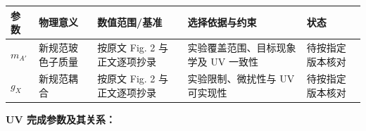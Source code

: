 \documentclass[
  chinese,
  UTF8]{ctexart}
\newcounter{none} %
\begin{document}
{\def\LTcaptype{none} %
\begin{longtable}[]{@{}
  >{\raggedright\arraybackslash}p{}
  >{\raggedright\arraybackslash}p{}
  >{\raggedright\arraybackslash}p{}
  >{\raggedright\arraybackslash}p{}
  >{\raggedright\arraybackslash}p{}@{}}
\toprule\noalign{}
\begin{minipage}[b]{\linewidth}\raggedright
参数
\end{minipage} & \begin{minipage}[b]{\linewidth}\raggedright
物理意义
\end{minipage} & \begin{minipage}[b]{\linewidth}\raggedright
数值范围/基准
\end{minipage} & \begin{minipage}[b]{\linewidth}\raggedright
选择依据与约束
\end{minipage} & \begin{minipage}[b]{\linewidth}\raggedright
状态
\end{minipage} \\
\midrule\noalign{}
\endhead
\bottomrule\noalign{}
\endlastfoot
\(m_{A'}\) & 新规范玻色子质量 & 按原文 Fig. 2 与正文逐项抄录 &
实验覆盖范围、目标现象学及 UV 一致性 & 待按指定版本核对 \\
\(g_X\) & 新规范耦合 & 按原文 Fig. 2 与正文逐项抄录 & 实验限制、微扰性与
UV 可实现性 & 待按指定版本核对 \\
\end{longtable}
}

\textbf{UV 完成参数及其关系：}
\end{document}
